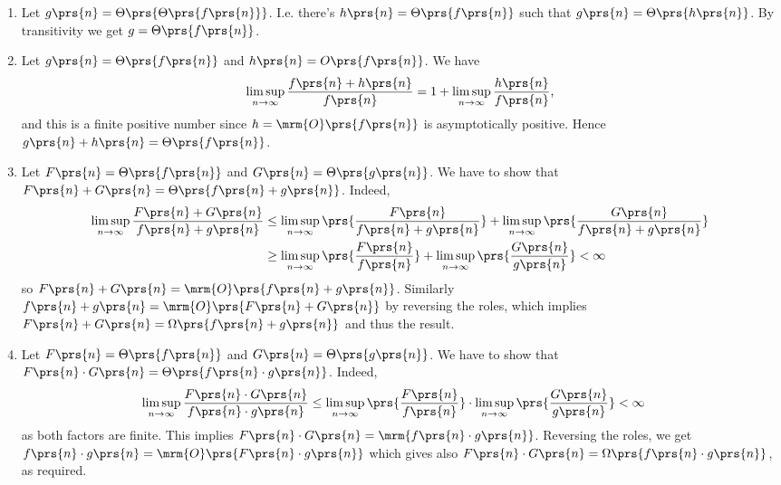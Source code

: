 \documentclass[oneside]{scrbook}
\theoremstyle{definition}
\begin{document}
\begin{problem} \label{problem:manipulating-asymptotics}
\begin{enumerate}[label = \alph*.]
    \item Let $g\prs{n} = \Theta\prs{\Theta\prs{f\prs{n}}}$. I.e. there's $h\prs{n} = \Theta\prs{f\prs{n}}$ such that $g\prs{n} = \Theta\prs{h\prs{n}}$. By transitivity we get $g = \Theta\prs{f\prs{n}}$.
    
    \item Let $g\prs{n} = \Theta\prs{f\prs{n}}$ and $h\prs{n} = O\prs{f\prs{n}}$. We have
    \begin{align*}
        \limsup_{n\to\infty} \frac{f\prs{n} + h\prs{n}}{f\prs{n}} = 1 + \limsup_{n\to\infty} \frac{h\prs{n}}{f\prs{n}} \text{,}
    \end{align*}
    and this is a finite positive number since $h = \mrm{O}\prs{f\prs{n}}$ is asymptotically positive. Hence $g\prs{n} + h\prs{n} = \Theta\prs{f\prs{n}}$.
    
    \item Let $F\prs{n} = \Theta\prs{f\prs{n}}$ and $G\prs{n} = \Theta\prs{g\prs{n}}$. We have to show that $F\prs{n} + G\prs{n} = \Theta\prs{f\prs{n} + g\prs{n}}$. Indeed,
    \begin{align*}
        \limsup_{n\to\infty} \frac{F\prs{n} + G\prs{n}}{f\prs{n} + g\prs{n}} &\leq
        \limsup_{n\to\infty} \prs{\frac{F\prs{n}}{f\prs{n} + g\prs{n}}} +  \limsup_{n\to\infty} \prs{\frac{G\prs{n}}{f\prs{n} + g\prs{n}}}
        \\&\geq
        \limsup_{n\to\infty} \prs{\frac{F\prs{n}}{f\prs{n}}} +  \limsup_{n\to\infty} \prs{\frac{G\prs{n}}{g\prs{n}}} < \infty
    \end{align*}
    so $F\prs{n} + G\prs{n} = \mrm{O}\prs{f\prs{n} + g\prs{n}}$.
    Similarly $f\prs{n} + g\prs{n} = \mrm{O}\prs{F\prs{n} + G\prs{n}}$ by reversing the roles, which implies $F\prs{n} + G\prs{n} = \Omega\prs{f\prs{n} + g\prs{n}}$ and thus the result.
    
    \item Let $F\prs{n} = \Theta\prs{f\prs{n}}$ and $G\prs{n} = \Theta\prs{g\prs{n}}$. We have to show that $F\prs{n} \cdot G\prs{n} = \Theta\prs{f\prs{n} \cdot g\prs{n}}$. Indeed,
    \begin{align*}
        \limsup_{n\to\infty} \frac{F\prs{n} \cdot G\prs{n}}{f\prs{n} \cdot g\prs{n}} &\leq
        \limsup_{n\to\infty} \prs{\frac{F\prs{n}}{f\prs{n}}} \cdot \limsup_{n\to\infty} \prs{\frac{G\prs{n}}{g\prs{n}}} < \infty
    \end{align*}
    as both factors are finite. This implies $F\prs{n} \cdot G\prs{n} = \mrm{f\prs{n} \cdot g\prs{n}}$. Reversing the roles, we get $f\prs{n} \cdot g\prs{n} = \mrm{O}\prs{F\prs{n} \cdot g\prs{n}}$ which gives also $F\prs{n} \cdot G\prs{n} = \Omega\prs{f\prs{n} \cdot g\prs{n}}$, as required.
    

\end{enumerate}
\end{problem}
\end{document}

